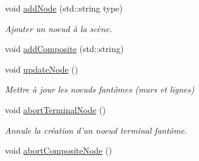\begin{DoxyCompactItemize}
\item 
void \hyperlink{group__inf2990_ga22eeedd655650984efa7da6d3d2564eb}{add\-Node} (std\-::string type)
\begin{DoxyCompactList}\small\item\em Ajouter un noeud à la scène. \end{DoxyCompactList}\item 
void \hyperlink{group__inf2990_ga84c93e92df125b294651c3bb04201624}{add\-Composite} (std\-::string)
\item 
void \hyperlink{group__inf2990_ga3d780d2a98e5abe59033ba9791065d7d}{update\-Node} ()
\begin{DoxyCompactList}\small\item\em Mettre à jour les noeuds fantômes (murs et lignes) \end{DoxyCompactList}\item 
void \hyperlink{group__inf2990_gaf1099ad811d94b7ede2572fbd3c7c89e}{abort\-Terminal\-Node} ()
\begin{DoxyCompactList}\small\item\em Annule la création d'un noeud terminal fantôme. \end{DoxyCompactList}\item 
\hypertarget{group__inf2990_gaf17fbb34428b0e0a22ffcdc245e52d19}{void \hyperlink{group__inf2990_gaf17fbb34428b0e0a22ffcdc245e52d19}{abort\-Composite\-Node} ()}\label{group__inf2990_gaf17fbb34428b0e0a22ffcdc245e52d19}


\end{DoxyCompactItemize}
